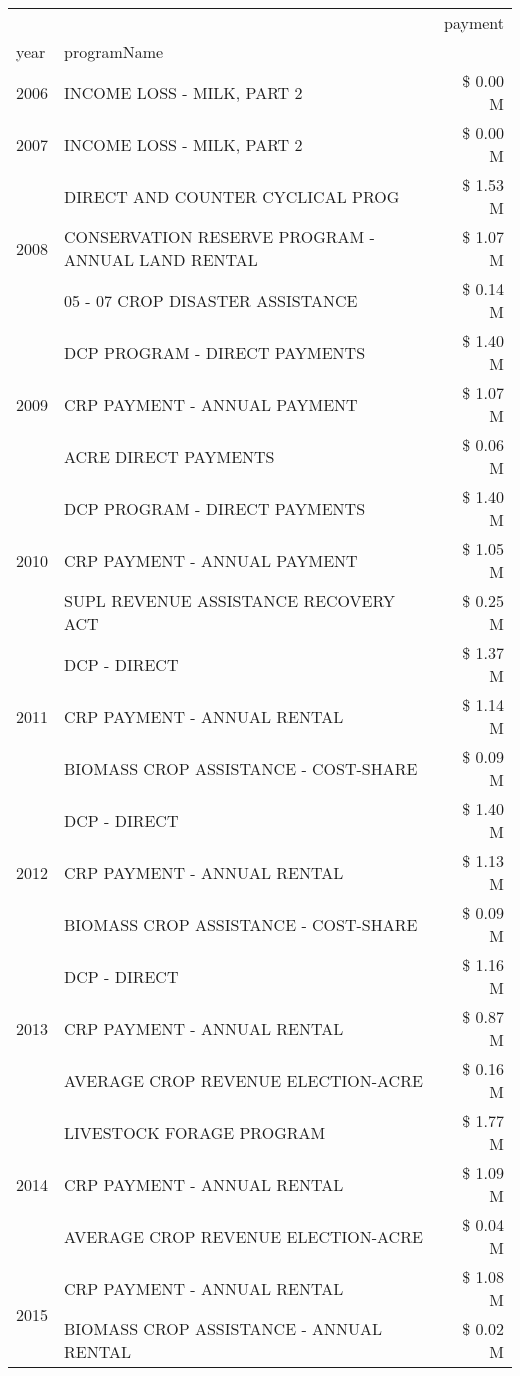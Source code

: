 \begin{tabular}{llr}
\toprule
 &  & payment \\
year & programName &  \\
\midrule
2006 & INCOME LOSS - MILK, PART 2 & \$ 0.00 M \\
\cline{1-3}
2007 & INCOME LOSS - MILK, PART 2 & \$ 0.00 M \\
\cline{1-3}
\multirow[t]{3}{*}{2008} & DIRECT AND COUNTER CYCLICAL PROG & \$ 1.53 M \\
 & CONSERVATION RESERVE PROGRAM - ANNUAL LAND RENTAL & \$ 1.07 M \\
 & 05 - 07 CROP DISASTER ASSISTANCE & \$ 0.14 M \\
\cline{1-3}
\multirow[t]{3}{*}{2009} & DCP PROGRAM - DIRECT PAYMENTS & \$ 1.40 M \\
 & CRP PAYMENT - ANNUAL PAYMENT & \$ 1.07 M \\
 & ACRE DIRECT PAYMENTS & \$ 0.06 M \\
\cline{1-3}
\multirow[t]{3}{*}{2010} & DCP PROGRAM - DIRECT PAYMENTS & \$ 1.40 M \\
 & CRP PAYMENT - ANNUAL PAYMENT & \$ 1.05 M \\
 & SUPL REVENUE ASSISTANCE RECOVERY ACT & \$ 0.25 M \\
\cline{1-3}
\multirow[t]{3}{*}{2011} & DCP - DIRECT & \$ 1.37 M \\
 & CRP PAYMENT - ANNUAL RENTAL & \$ 1.14 M \\
 & BIOMASS CROP ASSISTANCE - COST-SHARE & \$ 0.09 M \\
\cline{1-3}
\multirow[t]{3}{*}{2012} & DCP - DIRECT & \$ 1.40 M \\
 & CRP PAYMENT - ANNUAL RENTAL & \$ 1.13 M \\
 & BIOMASS CROP ASSISTANCE - COST-SHARE & \$ 0.09 M \\
\cline{1-3}
\multirow[t]{3}{*}{2013} & DCP - DIRECT & \$ 1.16 M \\
 & CRP PAYMENT - ANNUAL RENTAL & \$ 0.87 M \\
 & AVERAGE CROP REVENUE ELECTION-ACRE & \$ 0.16 M \\
\cline{1-3}
\multirow[t]{3}{*}{2014} & LIVESTOCK FORAGE PROGRAM & \$ 1.77 M \\
 & CRP PAYMENT - ANNUAL RENTAL & \$ 1.09 M \\
 & AVERAGE CROP REVENUE ELECTION-ACRE & \$ 0.04 M \\
\cline{1-3}
\multirow[t]{3}{*}{2015} & CRP PAYMENT - ANNUAL RENTAL & \$ 1.08 M \\
 & BIOMASS CROP ASSISTANCE - ANNUAL RENTAL & \$ 0.02 M \\

\end{tabular}
